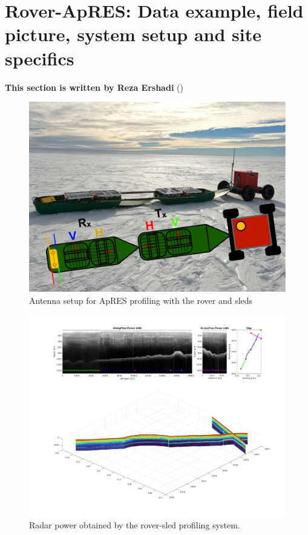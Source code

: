 \documentclass[a4paper,12pt]{article}
\begin{document}
\section{Rover-ApRES: Data example, field picture, system setup and site specifics}
\label{SecRoverApRES}
\textbf{This section is written by Reza Ershadi}
(\href{mailto:mohammadreza.ershadi@uni-tuebingen.de}{\color{blue}{Email Me}})\\
\begin{figure}[H]
	\includegraphics[width=\linewidth]{Figures/Traverse_Rover_Profiling.pdf}
	\caption{Antenna setup for ApRES profiling with the rover and sleds}
	\label{fig_rover}
\end{figure}
\begin{figure}[H]
	\includegraphics[width=\linewidth]{Figures/Rover_ApRES_Results.png}
	\caption{Radar power obtained by the rover-sled profiling system.}
	\label{fig_rover_res}
\end{figure}
\end{document}
